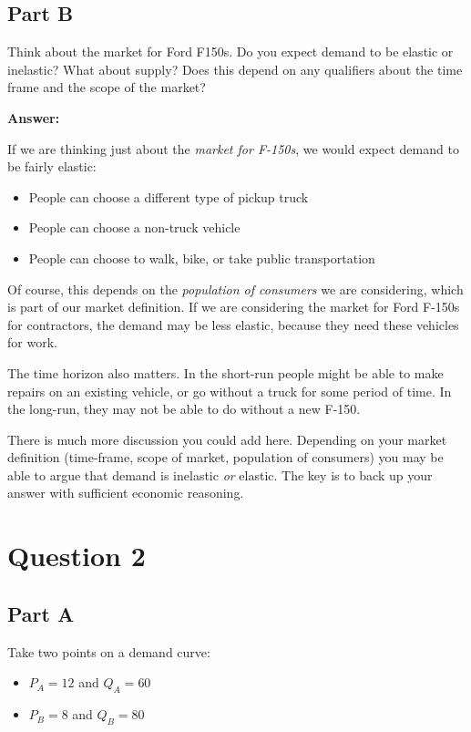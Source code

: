 \documentclass[12pt]{article}
\begin{document}
\subsection*{Part B}
Think about the market for Ford F150s. Do you expect demand to be elastic or inelastic? What about supply? Does this depend on any qualifiers about the time frame and the scope of the market?

\vspace{5mm}

\textbf{Answer:}

\vspace{2mm}

If we are thinking just about the \textit{market for F-150s}, we would expect demand to be fairly elastic:
\begin{itemize}
    \item People can choose a different type of pickup truck
    \item People can choose a non-truck vehicle
    \item People can choose to walk, bike, or take public transportation
\end{itemize}

Of course, this depends on the \textit{population of consumers} we are considering, which is part of our market definition. If we are considering the market for Ford F-150s for contractors, the demand may be less elastic, because they need these vehicles for work.

\vspace{2mm}

The time horizon also matters. In the short-run people might be able to make repairs on an existing vehicle, or go without a truck for some period of time. In the long-run, they may not be able to do without a new F-150.

\vspace{2mm}

There is much more discussion you could add here. Depending on your market definition (time-frame, scope of market, population of consumers) you may be able to argue that demand is inelastic \textit{or} elastic. The key is to back up your answer with sufficient economic reasoning.

\section*{Question 2}
\subsection*{Part A}
Take two points on a demand curve:
\begin{itemize}
    \item $P_A=12$ and $Q_A=60$
    \item $P_B=8$ and $Q_B=80$
\end{itemize}
\end{document}
